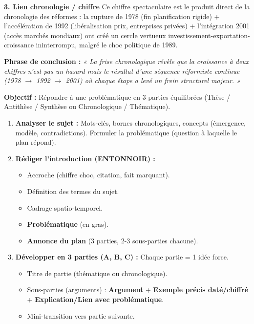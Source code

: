 \documentclass[11pt]{article}
\newcommand{\cle}[1]{{\popxbold\color{popdark}#1}}
\begin{document}
\begin{exoresolu}
\textbf{3. Lien chronologie / chiffre}
Ce chiffre spectaculaire est le produit direct de la \cle{chronologie des réformes} : la rupture de 1978 (fin planification rigide) + l'accélération de 1992 (libéralisation prix, entreprises privées) + l'intégration 2001 (accès marchés mondiaux) ont créé un cercle vertueux investissement-exportation-croissance ininterrompu, malgré le choc politique de 1989.

\textbf{Phrase de conclusion :} \emph{« La frise chronologique révèle que la croissance à deux chiffres n'est pas un hasard mais le résultat d'une séquence réformiste continue (1978 $\rightarrow$ 1992 $\rightarrow$ 2001) où chaque étape a levé un frein structurel majeur. »}
\end{exoresolu}

\begin{methode}
\textbf{Objectif :} Répondre à une problématique en 3 parties équilibrées (Thèse / Antithèse / Synthèse ou Chronologique / Thématique).
\begin{enumerate}
    \item \textbf{Analyser le sujet :} Mots-clés, bornes chronologiques, concepts (émergence, modèle, contradictions). Formuler la \cle{problématique} (question à laquelle le plan répond).
    \item \textbf{Rédiger l'introduction (ENTONNOIR) :} 
    \begin{itemize}
        \item Accroche (chiffre choc, citation, fait marquant).
        \item Définition des termes du sujet.
        \item Cadrage spatio-temporel.
        \item \textbf{Problématique} (en gras).
        \item \textbf{Annonce du plan} (3 parties, 2-3 sous-parties chacune).
    \end{itemize}
    \item \textbf{Développer en 3 parties (A, B, C) :} Chaque partie = 1 idée force. 
    \begin{itemize}
        \item Titre de partie (thématique ou chronologique).
        \item Sous-parties (arguments) : \textbf{Argument} + \textbf{Exemple précis daté/chiffré} + \textbf{Explication/Lien avec problématique}.
        \item Mini-transition vers partie suivante.

\end{itemize}
\end{enumerate}
\end{methode}
\end{document}
